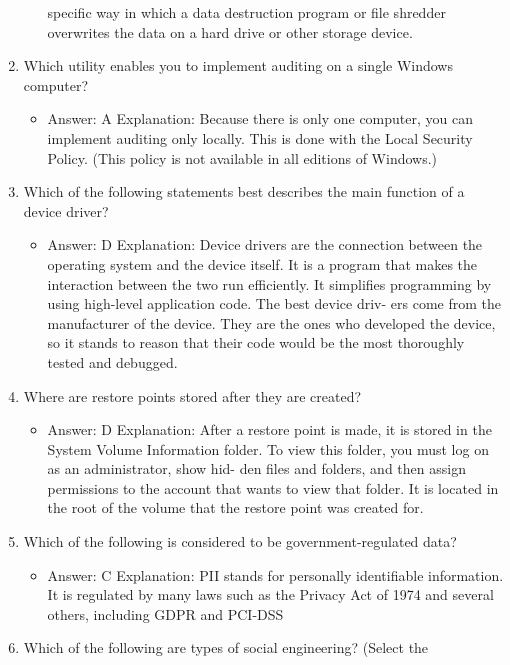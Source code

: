\documentclass{article}
\begin{document}
\begin{enumerate}
\begin{itemize}
specific way in which a data destruction program or file shredder overwrites the data
on a hard drive or other storage device.
    \end{itemize}
    \item Which utility enables you to implement auditing on a single
Windows computer?
    \begin{itemize}
        \item Answer: A
Explanation: Because there is only one computer, you can implement auditing only
locally. This is done with the Local Security Policy. (This policy is not available in all
editions of Windows.)
    \end{itemize}
    \item Which of the following statements best describes the main function
of a device driver?
    \begin{itemize}
        \item Answer: D
Explanation: Device drivers are the connection between the operating system and the
device itself. It is a program that makes the interaction between the two run efficiently.
It simplifies programming by using high-level application code. The best device driv-
ers come from the manufacturer of the device. They are the ones who developed the
device, so it stands to reason that their code would be the most thoroughly tested and
debugged.
    \end{itemize}
    \item Where are restore points stored after they are created?
    \begin{itemize}
        \item Answer: D
Explanation: After a restore point is made, it is stored in the System Volume
Information folder. To view this folder, you must log on as an administrator, show hid-
den files and folders, and then assign permissions to the account that wants to view
that folder. It is located in the root of the volume that the restore point was created for.
    \end{itemize}
    \item Which of the following is considered to be government-regulated
data?
    \begin{itemize}
        \item Answer: C
Explanation: PII stands for personally identifiable information. It is regulated by many
laws such as the Privacy Act of 1974 and several others, including GDPR and PCI-DSS
    \end{itemize}
    \item Which of the following are types of social engineering? (Select the

\end{enumerate}
\end{document}
